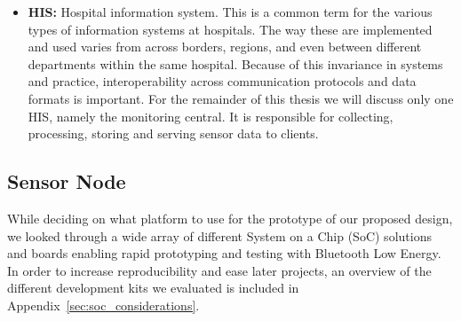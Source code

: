 \begin{itemize}
  \item[] \textbf{HIS:} Hospital information system. This is a common term for the various types of information systems at hospitals. The way these are implemented and used varies from across borders, regions, and even between different departments within the same hospital. Because of this invariance in systems and practice, interoperability across communication protocols and data formats is important. For the remainder of this thesis we will discuss only one HIS, namely the monitoring central. It is responsible for collecting, processing, storing and serving sensor data to clients.

\end{itemize}


\subsection{Sensor Node} %
\label{sub:node}

While deciding on what platform to use for the prototype of our proposed design, we looked through a wide array of different System on a Chip (SoC) solutions and boards enabling rapid prototyping and testing with Bluetooth Low Energy. In order to increase reproducibility and ease later projects, an overview of the different development kits we evaluated is included in Appendix~\ref{sec:soc_considerations}.

